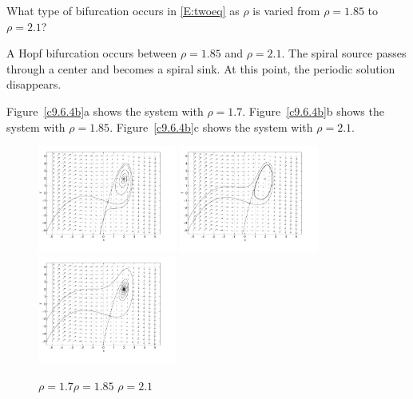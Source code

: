 \documentclass{ximera}
\begin{document}
\begin{computerExercise} \label{c9.6.4c}
What type of bifurcation occurs in \eqref{E:twoeq} as $\rho$ is varied
from $\rho=1.85$ to $\rho=2.1$?

\begin{solution}
A Hopf bifurcation occurs between $\rho = 1.85$ and
$\rho = 2.1$.  The spiral source passes through a center and becomes a
spiral sink.  At this point, the periodic solution disappears.

Figure~\ref{c9.6.4b}a shows the system with $\rho = 1.7$.
Figure~\ref{c9.6.4b}b shows the system with $\rho = 1.85$.
Figure~\ref{c9.6.4b}c shows the system with $\rho = 2.1$.

\begin{figure}[htb]
                       \centerline{%
                       \includegraphics[width=1.8in]{exfigure/9-6-4a.pdf}
                       \includegraphics[width=1.8in]{exfigure/9-6-4b.pdf}
                       \includegraphics[width=1.8in]{exfigure/9-6-4c.pdf}}
		\centerline{$\rho = 1.7$\hspace{1.3in}$\rho = 1.85$
\hspace{1.3in}$\rho = 2.1$}
\end{figure}


\end{solution}
\end{computerExercise}
\end{document}
